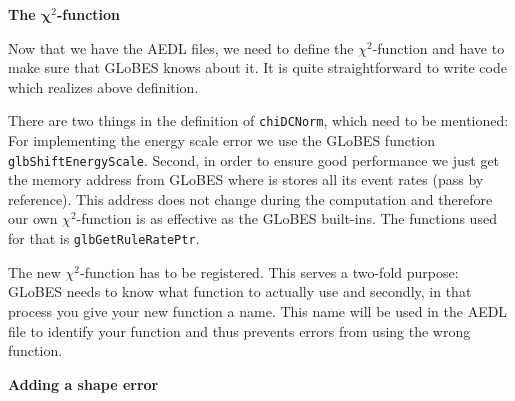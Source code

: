 \documentclass[12pt,a4paper]{article}
\newcommand{\aufg}[1]{\vspace{4mm}{\bf\underline{Problem #1:}}\vspace{3mm}}
\begin{document}
\aufg{2} {\bf The $\mathbf{\chi}^2$-function}

Now that we have the AEDL files, we need to define the $\chi^2$-function
and have to make sure that GLoBES knows about it. It is quite
straightforward to write code which realizes above definition.

There are two things in the definition of {\tt chiDCNorm}, which need
to be mentioned: For implementing the energy scale error we use the
GLoBES function {\tt  glbShiftEnergyScale}. Second, in order to ensure
good performance we just get the memory address from GLoBES where is
stores all its event rates (pass by reference). This address does not
change during the computation and therefore our own $\chi^2$-function
is as effective as the GLoBES built-ins. The functions used for that
is {\tt  glbGetRuleRatePtr}.

The new $\chi^2$-function has to be registered. This serves a
two-fold purpose: GLoBES needs to know what function to actually use
and secondly, in that process you give  your new
function a name. This name will be used in the AEDL file to identify your
function and thus prevents errors from using the wrong function.
 
\aufg{3} {\bf Adding a shape error}
\end{document}
